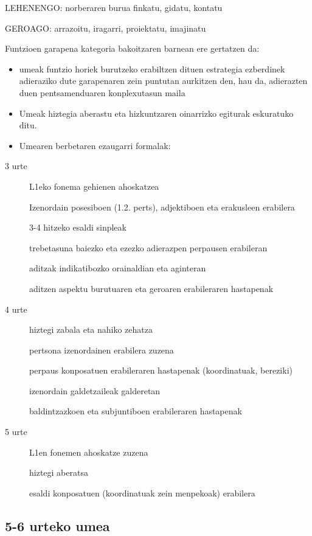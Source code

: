 \documentclass[
]{book}
\begin{document}
LEHENENGO: norberaren burua finkatu, gidatu, kontatu

GEROAGO: arrazoitu, iragarri, proiektatu, imajinatu

Funtzioen garapena kategoria bakoitzaren barnean ere gertatzen da:

\begin{itemize}
\item
  umeak funtzio horiek burutzeko erabiltzen dituen estrategia ezberdinek adieraziko dute garapenaren zein puntutan aurkitzen den, hau da, adierazten duen pentsamenduaren konplexutasun maila
\item
  Umeak hiztegia aberastu eta hizkuntzaren oinarrizko egiturak eskuratuko ditu.
\item
  Umearen berbetaren ezaugarri formalak:
\end{itemize}

\begin{description}
\item[3 urte]
L1eko fonema gehienen ahoskatzea

Izenordain posesiboen (1.2. perts), adjektiboen eta erakusleen erabilera

3-4 hitzeko esaldi sinpleak

trebetasuna baiezko eta ezezko adierazpen perpausen erabileran

aditzak indikatibozko orainaldian eta aginteran

aditzen aspektu burutuaren eta geroaren erabileraren hastapenak
\item[4 urte]
hiztegi zabala eta nahiko zehatza

pertsona izenordainen erabilera zuzena

perpaus konposatuen erabileraren hastapenak (koordinatuak, bereziki)

izenordain galdetzaileak galderetan

baldintzazkoen eta subjuntiboen erabileraren hastapenak
\item[5 urte]
L1en fonemen ahoskatze zuzena

hiztegi aberatsa

esaldi konposatuen (koordinatuak zein menpekoak) erabilera
\end{description}

\hypertarget{urteko-umea-2}{%
\subsection{5-6 urteko umea}\label{urteko-umea-2}}
\end{document}
